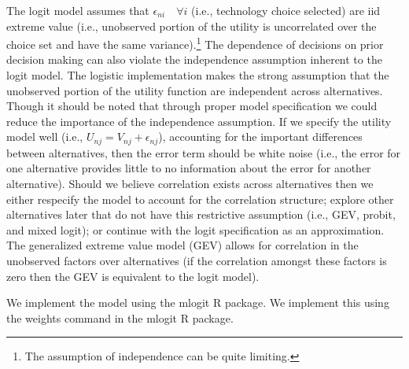 \documentclass[10pt]{amsart}
\begin{document}
The logit model assumes that $\epsilon_{ni} \quad \forall i$ (i.e., technology choice selected) are iid extreme value (i.e., unobserved portion of the utility is uncorrelated over the choice set and have the same variance).\footnote{The assumption of independence can be quite limiting.}  
The dependence of decisions on prior decision making can also violate the independence assumption inherent to the logit model. 
The logistic implementation makes the strong assumption that the unobserved portion of the utility function are independent across alternatives.
Though it should be noted that through proper model specification we could reduce the importance of the independence assumption. 
If we specify the utility model well (i.e., $U_{nj} = V_{nj} + \epsilon_{nj}$), accounting for the important differences between alternatives, then the error term should be white noise (i.e., the error for one alternative provides little to no information about the error for another alternative). 
Should we believe correlation exists across alternatives then we either respecify the model to account for the correlation structure; explore other alternatives later that do not have this restrictive assumption (i.e., GEV, probit, and mixed logit); or continue with the logit specification as an approximation. 
The generalized extreme value model (GEV) allows for correlation in the unobserved factors over alternatives (if the correlation amongst these factors is zero then the GEV is equivalent to the logit model).  

We implement the model using the mlogit R package. 
We implement this using the weights command in the mlogit R package.
  
\end{document}
